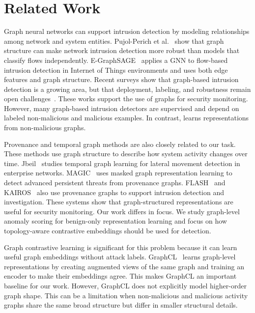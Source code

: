 \section{Related Work}\label{sec:related-work}

Graph neural networks can support intrusion detection by modeling relationships among network and system entities. Pujol-Perich et al.~\cite{pujolperich2021robustgnnids} show that graph structure can make network intrusion detection more robust than models that classify flows independently. E-GraphSAGE~\cite{lo2022egraphsage} applies a GNN to flow-based intrusion detection in Internet of Things environments and uses both edge features and graph structure. Recent surveys show that graph-based intrusion detection is a growing area, but that deployment, labeling, and robustness remain open challenges~\cite{GNN_IDS}. These works support the use of graphs for security monitoring. However, many graph-based intrusion detectors are supervised and depend on labeled non-malicious and malicious examples. In contrast, \sysname learns representations from non-malicious graphs.

Provenance and temporal graph methods are also closely related to our task. These methods use graph structure to describe how system activity changes over time. Jbeil~\cite{Jbeil} studies temporal graph learning for lateral movement detection in enterprise networks. MAGIC~\cite{MAGIC} uses masked graph representation learning to detect advanced persistent threats from provenance graphs. FLASH~\cite{Flash} and KAIROS~\cite{cheng2024kairos} also use provenance graphs to support intrusion detection and investigation. These systems show that graph-structured representations are useful for security monitoring. Our work differs in focus. We study graph-level anomaly scoring for benign-only representation learning and focus on how topology-aware contrastive embeddings should be used for detection.

Graph contrastive learning is significant for this problem because it can learn useful graph embeddings without attack labels. GraphCL~\cite{you2020graphcl} learns graph-level representations by creating augmented views of the same graph and training an encoder to make their embeddings agree. This makes GraphCL an important baseline for our work. However, GraphCL does not explicitly model higher-order graph shape. This can be a limitation when non-malicious and malicious activity graphs share the same broad structure but differ in smaller structural details.


